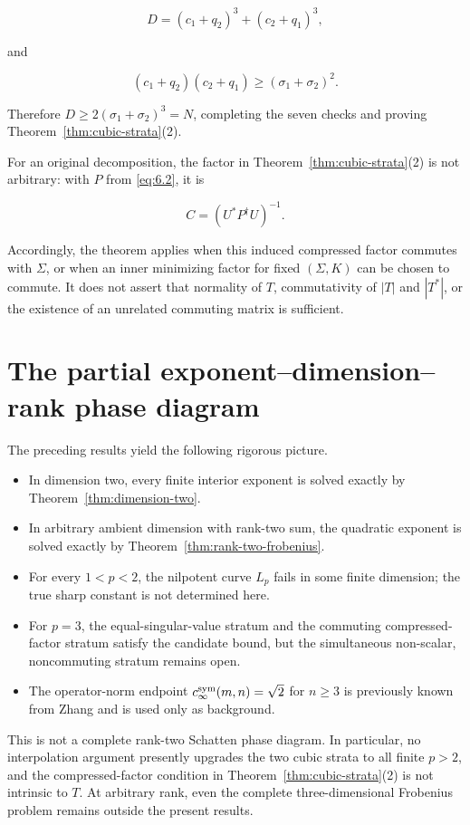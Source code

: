 \documentclass[11pt]{article}
\begin{document}
\[
D=(c_1+q_2)^3+(c_2+q_1)^3,
\tag{8.15}\label{eq:8.15}
\]

and

\[
(c_1+q_2)(c_2+q_1)
\ge(\sigma_1+\sigma_2)^2.
\tag{8.16}\label{eq:8.16}
\]

Therefore $D\ge2(\sigma_1+\sigma_2)^3=N$, completing the seven checks and
proving Theorem~\ref{thm:cubic-strata}(2).

For an original decomposition, the factor in Theorem~\ref{thm:cubic-strata}(2) is not arbitrary:
with $P$ from \eqref{eq:6.2}, it is

\[
C=(U^*P^\dagger U)^{-1}.
\tag{8.17}\label{eq:8.17}
\]

Accordingly, the theorem applies when this induced compressed factor commutes
with $\Sigma$, or when an inner minimizing factor for fixed $(\Sigma,K)$ can be
chosen to commute. It does not assert that normality of $T$, commutativity of
$|T|$ and $|T^*|$, or the existence of an unrelated commuting matrix is
sufficient.

\section{The partial exponent--dimension--rank phase diagram}


The preceding results yield the following rigorous picture.

\begin{itemize}
\item In dimension two, every finite interior exponent is solved exactly by
Theorem~\ref{thm:dimension-two}.
\item In arbitrary ambient dimension with rank-two sum, the quadratic exponent is
solved exactly by Theorem~\ref{thm:rank-two-frobenius}.
\item For every $1<p<2$, the nilpotent curve $L_p$ fails in some finite dimension;
the true sharp constant is not determined here.
\item For $p=3$, the equal-singular-value stratum and the commuting compressed-factor
stratum satisfy the candidate bound, but the simultaneous non-scalar,
noncommuting stratum remains open.
\item The operator-norm endpoint $c_\infty^{\rm sym}(m,n)=\sqrt2$ for $n\ge3$ is
previously known from Zhang and is used only as background.

\end{itemize}

This is not a complete rank-two Schatten phase diagram. In particular, no
interpolation argument presently upgrades the two cubic strata to all finite
$p>2$, and the compressed-factor condition in Theorem~\ref{thm:cubic-strata}(2) is not intrinsic
to $T$. At arbitrary rank, even the complete three-dimensional Frobenius problem
remains outside the present results.
\end{document}
